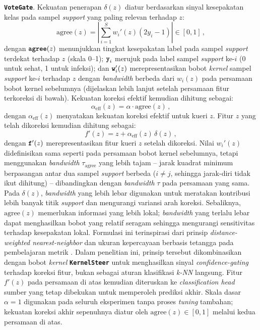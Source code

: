 \documentclass[conference]{IEEEtran}
\newcommand{\nama}[1]{\textbf{\texttt{#1}}}
\newcommand{\myparagraph}[1]{\vspace{0.2cm}\noindent\textbf{#1}.}
\begin{document}
\myparagraph{\nama{VoteGate}} Kekuatan penerapan $\delta(z)$ diatur berdasarkan sinyal kesepakatan kelas pada sampel \textit{support} yang paling relevan terhadap $z$:
\begin{equation}
\text{agree}(z) = \left\lvert\sum_{i=1}^{S} w_i'(z)(2y_i-1)\right\rvert \in [0,1] \, ,
\tag*{}\label{eq:votegate}
\end{equation}
dengan $\text{\nama{agree}}(z)$ menunjukkan tingkat kesepakatan label pada sampel \textit{support} terdekat terhadap $z$ (skala 0--1); $\text{\nama{y}}_i$ merujuk pada label sampel \textit{support} ke-$i$ (0 untuk sehat, 1 untuk infeksi); dan $\text{\nama{w}}_i'(z)$ merepresentasikan bobot \textit{kernel} sampel \textit{support} ke-$i$ terhadap $z$ dengan \textit{bandwidth} berbeda dari $w_i(z)$ pada persamaan bobot kernel sebelumnya (dijelaskan lebih lanjut setelah persamaan fitur terkoreksi di bawah). Kekuatan koreksi efektif kemudian dihitung sebagai:
\begin{equation}
\alpha_{\text{eff}}(z)=\alpha\cdot\text{agree}(z) \, ,
\tag*{}\label{eq:alphaeff}
\end{equation}
dengan $\alpha_{\text{eff}}(z)$ menyatakan kekuatan koreksi efektif untuk kueri $z$. Fitur $z$ yang telah dikoreksi kemudian dihitung sebagai:
\begin{equation}
f'(z)=z+\alpha_{\text{eff}}(z)\,\delta(z) \, ,
\tag*{}\label{eq:votegateapply}
\end{equation}
dengan $\text{\nama{f}}'(z)$ merepresentasikan fitur kueri $z$ setelah dikoreksi. Nilai $w_i'(z)$ didefinisikan sama seperti pada persamaan bobot kernel sebelumnya, tetapi menggunakan \textit{bandwidth} $\tau_{\text{agree}}$ yang lebih tajam -- jarak kuadrat minimum berpasangan antar dua sampel \textit{support} berbeda ($i\neq j$, sehingga jarak-diri tidak ikut dihitung) -- dibandingkan dengan \textit{bandwidth} $\tau$ pada persamaan yang sama. Pada $\delta(z)$, \textit{bandwidth} yang lebih lebar digunakan untuk meratakan kontribusi lebih banyak titik \textit{support} dan mengurangi variansi arah koreksi. Sebaliknya, $\text{agree}(z)$ memerlukan informasi yang lebih lokal; \textit{bandwidth} yang terlalu lebar dapat menghasilkan bobot yang relatif seragam sehingga mengurangi sensitivitas terhadap kesepakatan lokal. Formulasi ini terinspirasi dari prinsip \textit{distance-weighted nearest-neighbor} \cite{b20} dan ukuran kepercayaan berbasis tetangga pada pembelajaran metrik \cite{b21}. Dalam penelitian ini, prinsip tersebut dikombinasikan dengan bobot \textit{kernel} \nama{KernelSteer} untuk menghasilkan sinyal \textit{confidence-gating} terhadap koreksi fitur, bukan sebagai aturan klasifikasi \textit{k-NN} langsung. Fitur $f'(z)$ pada persamaan di atas kemudian diteruskan ke \textit{classification head} sumber yang tetap dibekukan untuk memperoleh prediksi akhir. Skala dasar $\alpha=1$ digunakan pada seluruh eksperimen tanpa proses \textit{tuning} tambahan; kekuatan koreksi akhir sepenuhnya diatur oleh $\text{agree}(z)\in[0,1]$ melalui kedua persamaan di atas.
\end{document}
